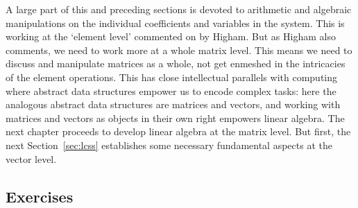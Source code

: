 A large part of this and preceding sections is devoted to arithmetic and algebraic manipulations on the individual coefficients and variables in the system. 
This is working at the `element level' commented on by Higham.
But as Higham also comments, we need to work more at a whole matrix level.
This means we need to discuss and manipulate matrices as a whole, not  get enmeshed in the intricacies of the element operations.
This has close intellectual parallels with computing where abstract data structures empower us to encode complex tasks: here the analogous abstract data structures are matrices and vectors, and working with matrices and vectors as objects in their own right empowers linear algebra.
The next chapter proceeds to develop linear algebra at the matrix level.
But first, the next Section~\ref{sec:lcss} establishes some necessary fundamental aspects at the vector level.




\subsection{Exercises}


